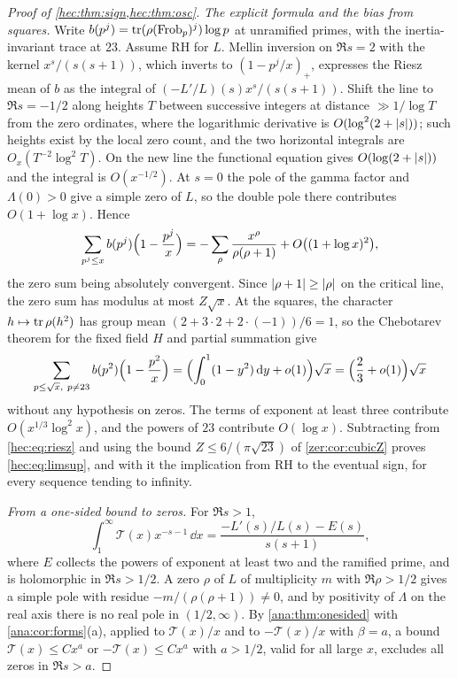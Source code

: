 \begin{proof}[Proof of \cref{hec:thm:sign,hec:thm:osc}]
\emph{The explicit formula and the bias from squares.}
Write $b(p^j)=\operatorname{tr}(\rho(\operatorname{Frob}_p)^j)\log p$ at unramified primes, with the inertia-invariant trace at $23$.
Assume RH for $L$. Mellin inversion on $\Re s=2$ with the kernel $x^s/(s(s+1))$, which inverts to
$(1-p^j/x)_+$, expresses the Riesz mean of $b$ as the integral of $(-L'/L)(s)x^s/(s(s+1))$. Shift the line
to $\Re s=-1/2$ along heights $T$ between successive integers at distance $\gg1/\log T$ from the zero
ordinates, where the logarithmic derivative is $O(\log^2(2+\lvert s\rvert))$; such heights exist by the local zero
count, and the two horizontal integrals are $O_x(T^{-2}\log^2T)$. On the new line the functional equation
gives $O(\log(2+\lvert s\rvert))$ and the integral is $O(x^{-1/2})$. At $s=0$ the pole of the gamma factor and
$\Lambda(0)>0$ give a simple zero of $L$, so the double pole there contributes $O(1+\log x)$. Hence
\begin{equation}\label{hec:eq:riesz}
 \sum_{p^j\le x}b(p^j)\Bigl(1-\frac{p^j}x\Bigr)
 =-\sum_{\rho}\frac{x^{\rho}}{\rho(\rho+1)}+O\bigl((1+\log x)^2\bigr),
\end{equation}
the zero sum being absolutely convergent. Since $\lvert\rho+1\rvert\ge\lvert\rho\rvert$ on the critical line, the zero
sum has modulus at most $Z\sqrt x$. At the squares, the character $h\mapsto\operatorname{tr}\rho(h^2)$ has group mean
$(2+3\cdot2+2\cdot(-1))/6=1$, so the Chebotarev theorem for the fixed field $H$ and partial summation give
\begin{equation}\label{hec:eq:squares}
 \sum_{p\le\sqrt x,\ p\ne23}b(p^2)\Bigl(1-\frac{p^2}x\Bigr)
 =\Bigl(\int_0^1(1-y^2)\,\mathrm{d} y+o(1)\Bigr)\sqrt x=\Bigl(\frac23+o(1)\Bigr)\sqrt x
\end{equation}
without any hypothesis on zeros. The terms of exponent at least three contribute $O(x^{1/3}\log^2x)$, and
the powers of $23$ contribute $O(\log x)$. Subtracting from \eqref{hec:eq:riesz} and using the bound
$Z\le6/(\pi\sqrt{23})$ of \cref{zer:cor:cubicZ} proves \eqref{hec:eq:limsup}, and with it the implication
from RH to the eventual sign, for every sequence tending to infinity.

\emph{From a one-sided bound to zeros.}
For $\Re s>1$,
\begin{equation}\label{hec:eq:Tmellin}
 \int_1^\infty \mathcal{T}(x)x^{-s-1}\,\dd x=\frac{-L'(s)/L(s)-E(s)}{s(s+1)},
\end{equation}
where $E$ collects the powers of exponent at least two and the ramified prime, and is holomorphic in
$\Re s>1/2$. A zero $\rho$ of $L$ of multiplicity $m$ with $\Re\rho>1/2$ gives a simple pole with residue
$-m/(\rho(\rho+1))\ne0$, and by positivity of $\Lambda$ on the real axis there is no real pole in
$(1/2,\infty)$. By \cref{ana:thm:onesided} with \cref{ana:cor:forms}(a), applied to $\mathcal{T}(x)/x$ and to
$-\mathcal{T}(x)/x$ with $\beta=a$, a bound $\mathcal{T}(x)\le Cx^{a}$ or $-\mathcal{T}(x)\le Cx^{a}$ with $a>1/2$, valid for all
large $x$, excludes all zeros in $\Re s>a$.


\end{proof}
